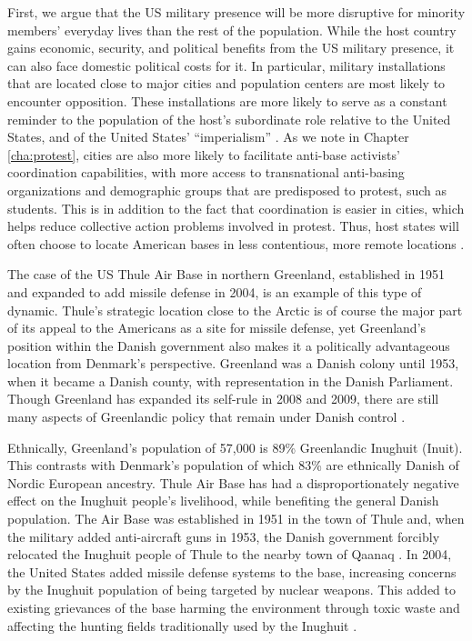 First, we argue that the US military presence will be more disruptive for minority members' everyday lives than the rest of the population. While the host country gains economic, security, and political benefits from the US military presence, it can also face domestic political costs for it. In particular, military installations that are located close to major cities and population centers are most likely to encounter opposition. These installations are more likely to serve as a constant reminder to the population of the host's subordinate role relative to the United States, and of the United States' ``imperialism'' \cite{cooley2008}. As we note in Chapter \ref{cha:protest}, cities are also more likely to facilitate anti-base activists' coordination capabilities, with more access to transnational anti-basing organizations and demographic groups that are predisposed to protest, such as students. This is in addition to the fact that coordination is easier in cities, which helps reduce collective action problems involved in protest. Thus, host states will often choose to locate American bases in less contentious, more remote locations \cite{cooley2008}.

The case of the US Thule Air Base in northern Greenland, established in 1951 and expanded to add missile defense in 2004, is an example of this type of dynamic. Thule's strategic location close to the Arctic is of course the major part of its appeal to the Americans as a site for missile defense, yet Greenland's position within the Danish government also makes it a politically advantageous location from Denmark's perspective. Greenland was a Danish colony until 1953, when it became a Danish county, with representation in the Danish Parliament. Though Greenland has expanded its self-rule in 2008 and 2009, there are still many aspects of Greenlandic policy that remain under Danish control \cite{Dragsdahl2005}. 

Ethnically, Greenland's population of 57,000 is 89\% Greenlandic Inughuit (Inuit). This contrasts with Denmark's population of which 83\% are ethnically Danish of Nordic European ancestry. Thule Air Base has had a disproportionately negative effect on the Inughuit people's livelihood, while benefiting the general Danish population. The Air Base was established in 1951 in the town of Thule and, when the military added anti-aircraft guns in 1953, the Danish government forcibly relocated the Inughuit people of Thule to the nearby town of Qaanaq \cite{Spiermann2004}. In 2004, the United States added missile defense systems to the base, increasing concerns by the Inughuit population of being targeted by nuclear weapons. This added to existing grievances of the base harming the environment through toxic waste and affecting the hunting fields traditionally used by the Inughuit \cite{Dragsdahl2005}.

